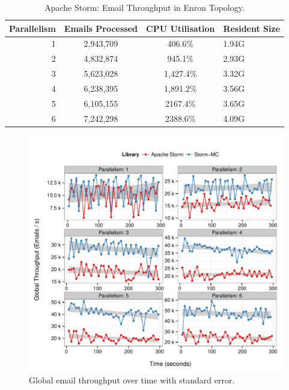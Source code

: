\documentclass[bsc,logo,frontabs,twoside,singlespacing,normalheadings,parskip]{infthesis}\usepackage[]{graphicx}\usepackage[]{color}
\makeatletter
\def\maxwidth{ %
  \ifdim\Gin@nat@width>\linewidth
    \linewidth
  \else
    \Gin@nat@width
  \fi
}
\newenvironment{knitrout}{}{} %
\makeatother
\begin{document}
\begin{table}[!htb]
\begin{adjustwidth}{-0.5in}{-0.5in}
\centering
\small
\begin{tabular}{@{}rccl@{}}
    \textbf{Parallelism} & \textbf{Emails Processed} & \textbf{CPU Utilisation} & \textbf{Resident Size} \\ \toprule
    1 & {2,943,709} & {406.6\%} & {1.94G} \\
    2 & {4,832,874} & {945.1\%} & {2.93G} \\
    3 & {5,623,028} & {1,427.4\%} & {3.32G} \\
    4 & {6,238,395} & {1,891.2\%} & {3.56G} \\
    5 & {6,105,155} & {2167.4\%} & {3.65G} \\
    6 & {7,242,298} & {2388.6\%} & {4.09G} \\
\end{tabular}
\caption{Apache Storm: Email Throughput in Enron Topology.}
\label{table:storm_enron}
\end{adjustwidth}
\end{table}

\begin{knitrout}
\color{fgcolor}\begin{figure}[!htb]

{\centering \includegraphics[width=\maxwidth]{figure/enron-plot-1} 

}

\caption[Global email throughput over time with standard error]{Global email throughput over time with standard error.}\label{fig:enron-plot}
\end{figure}


\end{knitrout}
\end{document}
